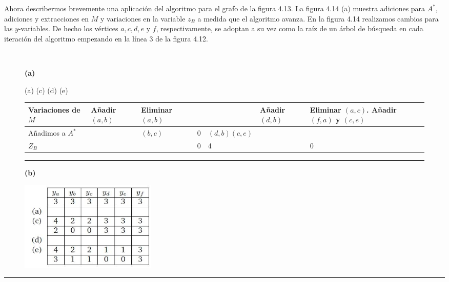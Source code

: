 \documentclass[10pt,a5paper]{book}
\begin{document}
Ahora describermos brevemente una aplicación del algoritmo para el grafo de la figura 4.13. La figura 4.14 (a) muestra adiciones para $A^*$, adiciones y extracciones en $M$ y variaciones en la variable $z_B$ a medida que el algoritmo avanza. En la figura 4.14 realizamos cambios para las $y$-variables. De hecho los vértices $a, c, d, e$ y $f$, respectivamente, se adoptan a su vez como la raíz de un árbol de búsqueda en cada iteración del algoritmo empezando en la línea 3 de la figura 4.12.

\begin{figure}[H]

\caption{ }
\hrulefill{}\\
\begin{flushleft}\hspace*{-.5in}\textbf{(a)}\end{flushleft}
\hspace*{.65in}(a) \qquad  (c) \qquad \qquad \qquad \qquad \qquad (d) \qquad \qquad (e)\\
\parbox{2cm}
{
\begin{center}
\hspace*{-.45in}
\begin{tabular}{|p{1.75cm}|p{1cm}|p{1.25cm}|p{0.20cm}|p{1.3cm}|p{1cm}|p{2.5cm}|}
\hline
Variaciones de $M$ & Añadir $(a,b)$ & Eliminar $(a,b)$ & & & Añadir $(d,b)$ & Eliminar $(a,c)$. Añadir $(f,a)$ y $(c,e)$ \\
\hline
Añadimos a $A^*$ &  & $(b,c)$ & 0 & $(d,b) (c,e)$ & & \\
\hline
$Z_B$ & & & 0 & 4 & & 0 \\
\hline
\end{tabular}
\end{center}
}
\hrule
\begin{flushleft}\hspace*{-.5in}\textbf{(b)}\end{flushleft}
\parbox{2cm}
{
\begin{center}
\hspace*{.5in}
\includegraphics[width=6.5cm]{Fig4_14_b.png}
\end{center}
}
\end{figure}
\hrule{}
\end{document}
